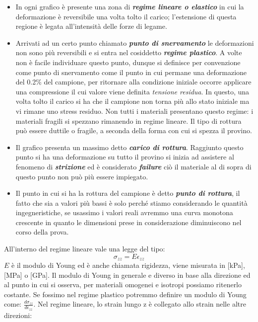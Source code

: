 \begin{itemize}
    \item In ogni grafico è presente una zona di \textbf{\textit{regime lineare o elastico}} in cui la deformazione è reversibile una volta tolto il carico; l'estensione di questa regione è legata all'intensità delle forze di legame.
    \item Arrivati ad un certo punto chiamato \textbf{\textit{punto di snervamento}} le deformazioni non sono più reversibili e si entra nel cosiddetto \textbf{\textit{regime plastico}}. A volte non è facile individuare questo punto, dunque si definisce per convenzione come punto di snervamento come il punto in cui permane una deformazione del 0.2\% del campione, per ritornare alla condizione iniziale occorre applicare una compressione il cui valore viene definita \textit{tensione residua}. In questo, una volta tolto il carico si ha che il campione non torna più allo stato iniziale ma vi rimane uno stress residuo.
    Non tutti i  materiali presentano questo regime: i materiali fragili si spezzano rimanendo in regime lineare. Il tipo  di rottura può essere duttile o fragile, a seconda della forma con cui si spezza il provino.
    \item Il grafico presenta un massimo detto \textbf{\textit{carico di rottura}}. Raggiunto questo punto si ha una deformazione su tutto il provino si inizia ad assistere al fenomeno di \textbf{\textit{strizione}} ed è considerato \textbf{\textit{failure}} ciò il materiale al di sopra di questo punto non può più essere impiegato. 
    \item Il punto in cui si ha la rottura del campione è detto \textbf{\textit{punto di rottura}}, il fatto che sia a valori più bassi è solo perché stiamo considerando le quantità ingegneristiche, se usassimo i valori reali avremmo una curva monotona crescente in quanto le dimensioni prese in considerazione diminuiscono nel corso della prova.
\end{itemize}
All'interno del regime lineare vale una legge del tipo:
\begin{equation}
    \sigma_{zz}=E\epsilon_{zz}
\end{equation}
$E$ è il modulo di Young ed è anche chiamata rigidezza, viene misurata in [kPa], [MPa] o [GPa]. Il modulo di Young in generale e diverso in base alla direzione ed al punto in cui si osserva, per materiali omogenei e isotropi possiamo ritenerlo costante. Se fossimo nel regime plastico potremmo definire un modulo di Young come: $\frac{d\sigma_{zz}}{d\epsilon_{zz}}$. 
Nel regime lineare, lo strain lungo z è collegato allo strain nelle altre direzioni:
